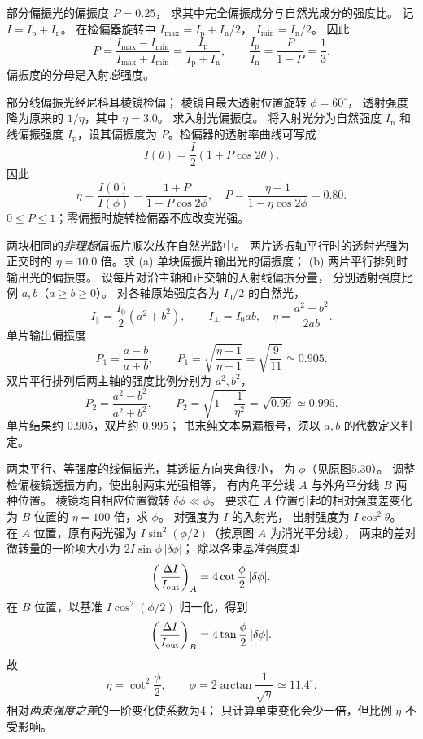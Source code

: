 部分偏振光的偏振度 $P=0.25$，
求其中完全偏振成分与自然光成分的强度比。
\exsolution
记 $I=I_{\mathrm p}+I_{\mathrm n}$。
在检偏器旋转中
$I_{\max}=I_{\mathrm p}+I_{\mathrm n}/2$，
$I_{\min}=I_{\mathrm n}/2$。
因此
\[
 P=\frac{I_{\max}-I_{\min}}{I_{\max}+I_{\min}}
 =\frac{I_{\mathrm p}}{I_{\mathrm p}+I_{\mathrm n}},
 \qquad
 \boxed{\frac{I_{\mathrm p}}{I_{\mathrm n}}=
 \frac{P}{1-P}=\frac13}.
\]
\excheck 偏振度的分母是入射\emph{总}强度。

部分线偏振光经尼科耳棱镜检偏；
棱镜自最大透射位置旋转 $\phi=60^\circ$，
透射强度降为原来的 $1/\eta$，其中 $\eta=3.0$。
求入射光偏振度。
\exsolution
将入射光分为自然强度 $I_{\mathrm n}$ 和线偏振强度
$I_{\mathrm p}$，设其偏振度为 $P$。检偏器的透射率曲线可写成
\[
 I(\theta)=\frac I2(1+P\cos2\theta).
\]
因此
\[
 \eta=\frac{I(0)}{I(\phi)}
 =\frac{1+P}{1+P\cos2\phi},\quad
 \boxed{P=\frac{\eta-1}{1-\eta\cos2\phi}=0.80}.
\]
\excheck $0\le P\le1$；零偏振时旋转检偏器不应改变光强。

两块相同的\emph{非理想}偏振片顺次放在自然光路中。
两片透振轴平行时的透射光强为正交时的
$\eta=10.0$ 倍。求 (a) 单块偏振片输出光的偏振度；
(b) 两片平行排列时输出光的偏振度。
\exsolution
设每片对沿主轴和正交轴的入射线偏振分量，
分别透射强度比例 $a,b$（$a\ge b\ge0$）。
对各轴原始强度各为 $I_0/2$ 的自然光，
\[
 I_\parallel=\frac{I_0}{2}(a^2+b^2),\qquad
 I_\perp=I_0 ab,
 \quad\eta=\frac{a^2+b^2}{2ab}.
\]
单片输出偏振度
\[
 P_1=\frac{a-b}{a+b},\qquad
 \boxed{P_1=\sqrt{\frac{\eta-1}{\eta+1}}
 =\sqrt{\frac9{11}}\simeq0.905}.
\]
双片平行排列后两主轴的强度比例分别为 $a^2,b^2$，
\[
 P_2=\frac{a^2-b^2}{a^2+b^2},\qquad
 \boxed{P_2=\sqrt{1-\frac1{\eta^2}}
 =\sqrt{0.99}\simeq0.995}.
\]
\excheck 单片结果约 $0.905$，双片约 $0.995$；
书末纯文本易漏根号，须以 $a,b$ 的代数定义判定。

两束平行、等强度的线偏振光，其透振方向夹角很小，
为 $\phi$（见原图5.30）。
调整检偏棱镜透振方向，使出射两束光强相等，
有内角平分线 $A$ 与外角平分线 $B$ 两种位置。
棱镜均自相应位置微转 $\delta\phi\ll\phi$。
要求在 $A$ 位置引起的相对强度差变化
为 $B$ 位置的 $\eta=100$ 倍，求 $\phi$。
\exsolution
对强度为 $I$ 的入射光，
出射强度为 $I\cos^2\theta$。
在 $A$ 位置，原有两光强为
$I\sin^2(\phi/2)$（按原图 $A$ 为消光平分线），
两束的差对微转量的一阶项大小为
$2I\sin\phi\,|\delta\phi|$；
除以各束基准强度即
\[
 \left(\frac{\Delta I}{I_{\rm out}}\right)_A
 =4\cot\frac\phi2\,|\delta\phi|.
\]
在 $B$ 位置，以基准 $I\cos^2(\phi/2)$ 归一化，得到
\[
 \left(\frac{\Delta I}{I_{\rm out}}\right)_B
 =4\tan\frac\phi2\,|\delta\phi|.
\]
故
\[
 \eta=\cot^2\frac\phi2,\qquad
 \boxed{\phi=2\arctan\frac1{\sqrt\eta}\simeq11.4^\circ}.
\]
\excheck 相对\emph{两束强度之差}的一阶变化使系数为4；
只计算单束变化会少一倍，但比例 $\eta$ 不受影响。

